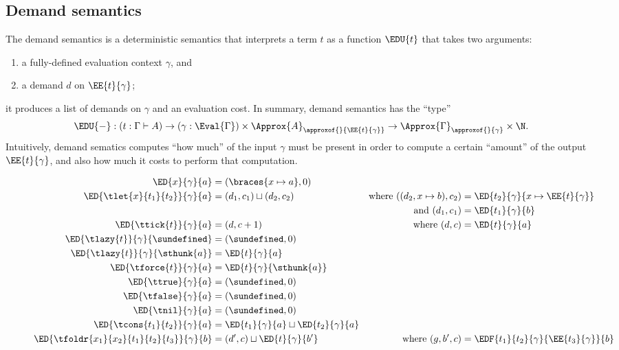 \subsection{Demand semantics}

The demand semantics is a deterministic semantics that interprets a term \( t \)
as a function \( \EDU{t} \) that takes two arguments:
\begin{enumerate}
\item a fully-defined evaluation context \( \gamma \), and
\item a demand \( d \) on \( \EE{t}{\gamma} \);
\end{enumerate}
it produces a list of demands on \( \gamma \) and an evaluation cost. In summary, demand semantics has the ``type''
\[
  \EDU{-} : (t : \Gamma \vdash A) \to (\gamma : \Eval{\Gamma}) \times \Approx{A}_{\approxof{\relax}{\EE{t}{\gamma}}} \to \Approx{\Gamma}_{\approxof{\relax}{\gamma}} \times \N .
\]
Intuitively, demand sematics computes ``how much'' of the input \( \gamma \) must be present in order to compute a certain ``amount'' of the output \( \EE{t}{\gamma} \), and also how much it costs to perform that computation.

\begin{figure}\centering
  \begin{align*}
    \ED{x}{\gamma}{a} &= (\braces{x \mapsto a}, 0) \\
    \ED{\tlet{x}{t_1}{t_2}}{\gamma}{a} &= (d_1, c_1) \sqcup (d_2, c_2) &\text{where } ((d_2, x \mapsto b), c_2) &= \ED{t_2}{\gamma}{x \mapsto \EE{t}{\gamma}} \\
    &&\text{and } (d_1, c_1) &= \ED{t_1}{\gamma}{b} \\
    \ED{\ttick{t}}{\gamma}{a} &= (d, c + 1) &\text{where } (d, c) &= \ED{t}{\gamma}{a} \\
    \ED{\tlazy{t}}{\gamma}{\sundefined} &= (\sundefined, 0) \\
    \ED{\tlazy{t}}{\gamma}{\sthunk{a}} &= \ED{t}{\gamma}{a} \\
    \ED{\tforce{t}}{\gamma}{a} &= \ED{t}{\gamma}{\sthunk{a}} \\
    \ED{\ttrue}{\gamma}{a} &= (\sundefined, 0) \\
    \ED{\tfalse}{\gamma}{a} &= (\sundefined, 0) \\
    \ED{\tnil}{\gamma}{a} &= (\sundefined, 0) \\
    \ED{\tcons{t_1}{t_2}}{\gamma}{a} &= \ED{t_1}{\gamma}{a} \sqcup \ED{t_2}{\gamma}{a} \\
    \ED{\tfoldr{x_1}{x_2}{t_1}{t_2}{t_3}}{\gamma}{b} &= (d', c) \sqcup \ED{t}{\gamma}{b'} &\text{where } (g, b', c) &= \EDF{t_1}{t_2}{\gamma}{\EE{t_3}{\gamma}}{b}
  \end{align*}
\end{figure}

